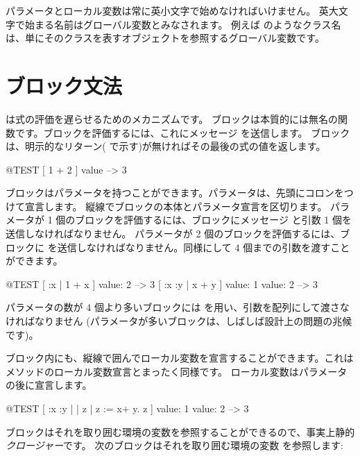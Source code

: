 \documentclass[a4paper,10pt,twoside]{book}
\begin{document}
パラメータとローカル変数は常に英小文字で始めなければいけません。
英大文字で始まる名前はグローバル変数とみなされます。
例えば  のようなクラス名は、単にそのクラスを表すオブジェクトを参照するグローバル変数です。

\section{ブロック文法}

は式の評価を遅らせるためのメカニズムです。
ブロックは本質的には無名の関数です。ブロックを評価するには、これにメッセージ  を送信します。
ブロックは、明示的なリターン(\ct{^} で示す)が無ければその最後の式の値を返します。

\begin{code}{@TEST}
[ 1 + 2 ] value --> 3
\end{code}

ブロックはパラメータを持つことができます。パラメータは、先頭にコロンをつけて宣言します。
縦線でブロックの本体とパラメータ宣言を区切ります。
パラメータが 1 個のブロックを評価するには、ブロックにメッセージ  と引数 1 個を送信しなければなりません。
パラメータが 2 個のブロックを評価するには、ブロックに を送信しなければなりません。同様にして 4 個までの引数を渡すことができます。

\begin{code}{@TEST}
[ :x | 1 + x ] value: 2 --> 3
[ :x :y | x + y ] value: 1 value: 2 --> 3
\end{code}

パラメータの数が 4 個より多いブロックには  を用い、引数を配列にして渡さなければなりません
(パラメータが多いブロックは、しばしば設計上の問題の兆候です)。

ブロック内にも、縦線で囲んでローカル変数を宣言することができます。これはメソッドのローカル変数宣言とまったく同様です。
ローカル変数はパラメータの後に宣言します。

\begin{code}{@TEST}
[ :x :y | | z | z := x+ y. z ] value: 1 value: 2 --> 3
\end{code}

ブロックはそれを取り囲む環境の変数を参照することができるので、事実上静的\emph{クロージャー}です。
次のブロックはそれを取り囲む環境の変数  を参照します:
\end{document}
